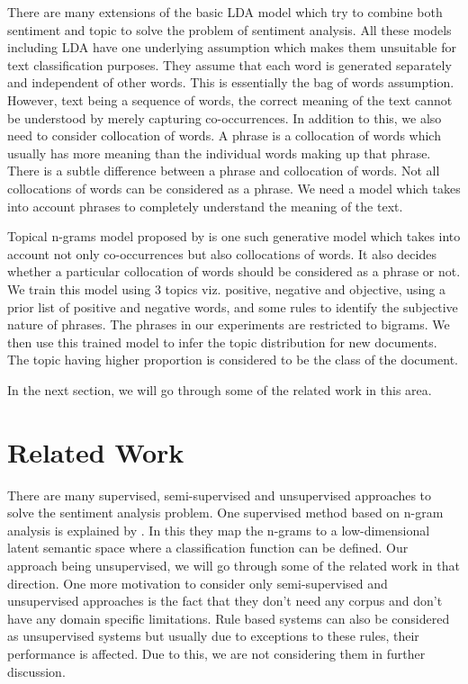 There are many extensions of the basic LDA model which try to combine both sentiment and topic to solve the problem of sentiment analysis. All these models 
including LDA have one underlying assumption which makes them unsuitable for text classification purposes. They assume that each word is generated separately 
and independent of other words. This is essentially the bag of words assumption. However, text being a sequence of words, the correct meaning of the text cannot 
be understood by merely capturing co-occurrences. In addition to this, we also need to consider collocation of words. A phrase is a collocation of words which 
usually has more meaning than the individual words making up that phrase. There is a subtle difference between a phrase and collocation of words. Not all collocations
of words can be considered as a phrase. We need a model which takes into account phrases to completely understand the meaning of the text.

Topical n-grams model proposed by \citep*{wang2007topical} is one such generative model which takes into account not only co-occurrences but also collocations of 
words. It also decides whether a particular collocation of words should be considered as a phrase or not. We train this model using 3 topics viz. positive, negative
and objective, using a prior list of positive and negative words, and some rules to identify the subjective nature of phrases. The phrases in our experiments are 
restricted to bigrams. We then use this trained model to infer the topic distribution for new documents. The topic having higher proportion is considered to be the 
class of the document.

In the next section, we will go through some of the related work in this area.

\section{Related Work}

There are many supervised, semi-supervised and unsupervised approaches to solve the sentiment analysis problem. One supervised method based on n-gram analysis is 
explained by \citep*{bespalov2011sentiment}. In this they map the n-grams to a low-dimensional latent semantic space where a classification function can be defined.
Our approach being unsupervised, we will go through some of the related work in that direction. One more motivation to consider only semi-supervised and unsupervised
approaches is the fact that they don't need any corpus and don't have any domain specific limitations. Rule based systems can also be considered as unsupervised 
systems but usually due to exceptions to these rules, their performance is affected. Due to this, we are not considering them in further discussion.


